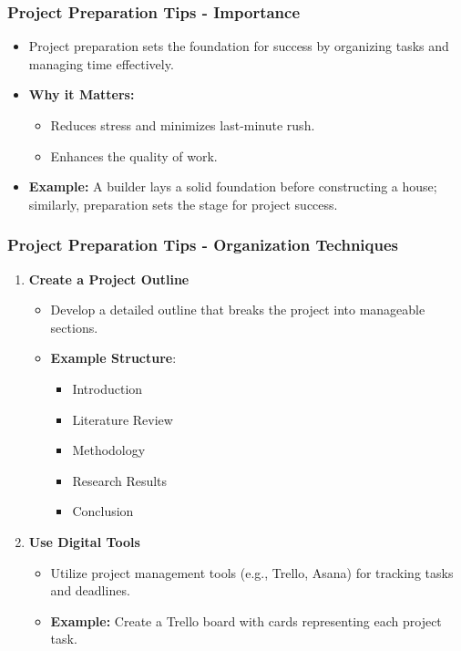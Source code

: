 \documentclass[aspectratio=169]{beamer}
\begin{document}
\begin{frame}[fragile]
    \frametitle{Project Preparation Tips - Importance}
    \begin{itemize}
        \item Project preparation sets the foundation for success by organizing tasks and managing time effectively.
        \item \textbf{Why it Matters:}
        \begin{itemize}
            \item Reduces stress and minimizes last-minute rush.
            \item Enhances the quality of work.
        \end{itemize}
        \item \textbf{Example:} A builder lays a solid foundation before constructing a house; similarly, preparation sets the stage for project success.
    \end{itemize}
\end{frame}

\begin{frame}[fragile]
    \frametitle{Project Preparation Tips - Organization Techniques}
    \begin{enumerate}
        \item \textbf{Create a Project Outline}
        \begin{itemize}
            \item Develop a detailed outline that breaks the project into manageable sections.
            \item \textbf{Example Structure}:
            \begin{itemize}
                \item Introduction
                \item Literature Review
                \item Methodology
                \item Research Results
                \item Conclusion
            \end{itemize}
        \end{itemize}
        
        \item \textbf{Use Digital Tools}
        \begin{itemize}
            \item Utilize project management tools (e.g., Trello, Asana) for tracking tasks and deadlines.
            \item \textbf{Example:} Create a Trello board with cards representing each project task.
        \end{itemize}
    \end{enumerate}
\end{frame}
\end{document}
